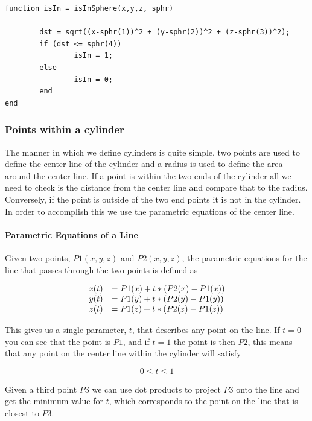 \documentclass[authoryearcitations]{UoYCSproject}
\begin{document}
\begin{lstlisting}[caption={Determining if a given point is in a given sphere}, label=lst:sphere]
function isIn = isInSphere(x,y,z, sphr)
	
        dst = sqrt((x-sphr(1))^2 + (y-sphr(2))^2 + (z-sphr(3))^2);
        if (dst <= sphr(4))
                isIn = 1;
        else
                isIn = 0;
        end
end
\end{lstlisting}

\subsubsection{Points within a cylinder}
The manner in which we define cylinders is quite simple, two points are used to define the center line of the
cylinder and a radius is used to define the area around the center line. If a point is within the two ends of the
cylinder all we need to check is the distance from the center line and compare that to the radius. Conversely, if the
point is outside of the two end points it is not in the cylinder. In order to accomplish this we use the parametric
equations of the center line. 

\paragraph{Parametric Equations of a Line}
Given two points, $P1(x,y,z)$ and $P2(x,y,z)$, the parametric equations for the line that passes through the two points
is defined as

\begin{equation}
\begin{array}{r l}
x(t) &= P1(x) + t * (P2(x) - P1(x)) \\
y(t) &= P1(y) + t * (P2(y) - P1(y)) \\
z(t) &= P1(z) + t * (P2(z) - P1(z)) 
\label{eq:paramet}
\end{array}
\end{equation}

This gives us a single parameter, $t$, that describes any point on the line. If $t = 0$ you can see that the
point is $P1$, and if $t = 1$ the point is then $P2$, this means that any point on the center line within the cylinder
will satisfy 

\begin{equation}
0 \leq t \leq 1 
\label{eq:tBoundary}
\end{equation}

Given a third point $P3$ we can use dot products to 
project $P3$ onto the line and get the minimum value for $t$, which corresponds to the point on the line 
that is closest to $P3$. 
\end{document}
